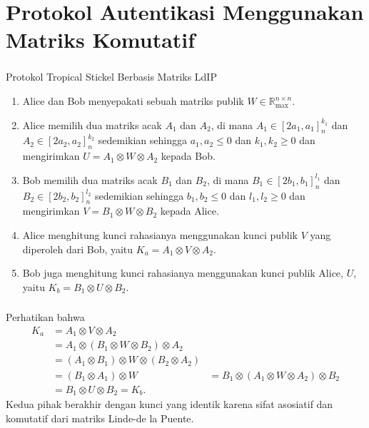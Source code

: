 \documentclass[aspectratio=169]{beamer}
\theoremstyle{definition}
\numberwithin{definisi}{section}
\begin{document}
\section{Protokol Autentikasi Menggunakan Matriks Komutatif}
\begin{frame}
  \frametitle{\insertsection}
  Protokol Tropical Stickel Berbasis Matriks LdIP \cite{alhussaini2024implementationstickel}

  \begin{enumerate}
    \item Alice dan Bob menyepakati sebuah matriks publik $W \in \mathbb{R}_{\max}^{n \times n}$.

    \item Alice memilih dua matriks acak $A_1$ dan $A_2$, di mana $A_1 \in [2a_1, a_1]_{n}^{k_1}$ dan $A_2 \in [2a_2, a_2]_{n}^{k_2}$ sedemikian sehingga $a_1, a_2 \le 0$ dan $k_1, k_2 \ge 0$ dan mengirimkan $U = A_1 \otimes W \otimes A_2$ kepada Bob.

    \item Bob memilih dua matriks acak $B_1$ dan $B_2$, di mana $B_1 \in [2b_1, b_1]_{n}^{l_1}$ dan $B_2 \in [2b_2, b_2]_{n}^{l_2}$ sedemikian sehingga $b_1, b_2 \le 0$ dan $l_1, l_2 \ge 0$ dan mengirimkan $V = B_1 \otimes W \otimes B_2$ kepada Alice.

    \item Alice menghitung kunci rahasianya menggunakan kunci publik $V$ yang diperoleh dari Bob, yaitu $K_a = A_1 \otimes V \otimes A_2$.

    \item Bob juga menghitung kunci rahasianya menggunakan kunci publik Alice, $U$, yaitu $K_b = B_1 \otimes U \otimes B_2$.
  \end{enumerate}

\end{frame}
\begin{frame}
  \frametitle{\insertsection}
  Perhatikan bahwa
  \begin{align*}
    K_a & = A_1 \otimes V \otimes A_2                             \\
        & = A_1 \otimes (B_1 \otimes W \otimes B_2) \otimes A_2   \\
        & = (A_1 \otimes B_1) \otimes W \otimes (B_2 \otimes A_2) \\
        & = (B_1 \otimes A_1) \otimes W \
        & = B_1 \otimes (A_1 \otimes W \otimes A_2) \otimes B_2   \\
        & = B_1 \otimes U \otimes B_2 = K_b.
  \end{align*}
  Kedua pihak berakhir dengan kunci yang identik karena sifat asosiatif dan komutatif dari matriks Linde-de la Puente.

\end{frame}
\end{document}
